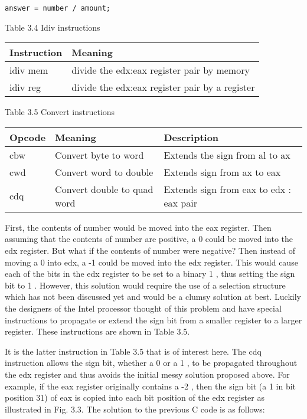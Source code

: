 \documentclass[10pt]{article}
\begin{document}
\begin{verbatim}
answer = number / amount;
\end{verbatim}

Table 3.4 Idiv instructions

\begin{center}
\begin{tabular}{|l|l|}
\hline
Instruction & Meaning \\
\hline
idiv mem & divide the edx:eax register pair by memory \\
\hline
idiv reg & divide the edx:eax register pair by a register \\
\hline
\end{tabular}
\end{center}

Table 3.5 Convert instructions

\begin{center}
\begin{tabular}{|l|l|l|}
\hline
Opcode & Meaning & Description \\
\hline
cbw & Convert byte to word & Extends the sign from al to ax \\
\hline
cwd & Convert word to double & Extends sign from ax to eax \\
\hline
cdq & Convert double to quad word & Extends sign from eax to edx : eax pair \\
\hline
\end{tabular}
\end{center}

First, the contents of number would be moved into the eax register. Then assuming that the contents of number are positive, a 0 could be moved into the edx register. But what if the contents of number were negative? Then instead of moving a 0 into edx, a -1 could be moved into the edx register. This would cause each of the bits in the edx register to be set to a binary 1 , thus setting the sign bit to 1 . However, this solution would require the use of a selection structure which has not been discussed yet and would be a clumsy solution at best. Luckily the designers of the Intel processor thought of this problem and have special instructions to propagate or extend the sign bit from a smaller register to a larger register. These instructions are shown in Table 3.5.

It is the latter instruction in Table 3.5 that is of interest here. The cdq instruction allows the sign bit, whether a 0 or a 1 , to be propagated throughout the edx register and thus avoids the initial messy solution proposed above. For example, if the eax register originally contains a -2 , then the sign bit (a 1 in bit position 31) of eax is copied into each bit position of the edx register as illustrated in Fig. 3.3. The solution to the previous C code is as follows:
\end{document}
